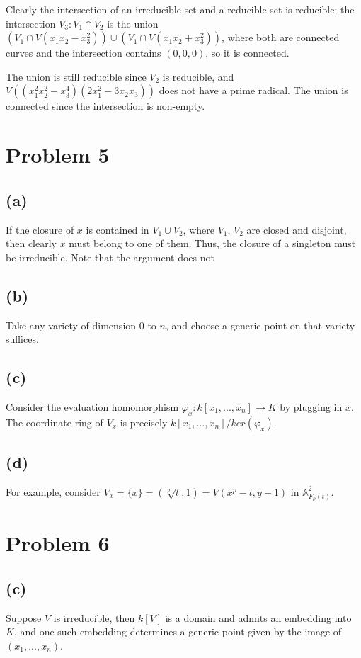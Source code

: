 \documentclass{article}
\theoremstyle{definition}
\theoremstyle{definition}
\theoremstyle{definition}
\theoremstyle{definition}
\theoremstyle{definition}
\theoremstyle{definition}
\theoremstyle{definition}
\begin{document}
Clearly the intersection of an irreducible set and a reducible set is reducible; the intersection $V_3:V_1\cap V_2$ is the union $(V_1\cap V(x_1x_2-x_3^2))\cup (V_1\cap V(x_1x_2+x_3^2))$, where both are connected curves and the intersection contains $(0,0,0)$, so it is connected.

The union is still reducible since $V_2$ is reducible, and $V((x_1^2x_2^2-x_3^4)(2x_1^2-3x_2x_3))$ does not have a prime radical. The union is connected since the intersection is non-empty.

\section*{Problem 5}
\subsection*{(a)}
If the closure of $x$ is contained in $V_1\cup V_2$, where $V_1$, $V_2$ are closed and disjoint, then clearly $x$ must belong to one of them. Thus, the closure of a singleton must be irreducible. Note that the argument does not 

\subsection*{(b)}
Take any variety of dimension $0$ to $n$, and choose a generic point on that variety suffices.

\subsection*{(c)}
Consider the evaluation homomorphism $\varphi_x: k[x_1,...,x_n]\to K$ by plugging in $x$. The coordinate ring of $V_x$ is precisely $k[x_1,...,x_n]/ker(\varphi_x)$. 

\subsection*{(d)}
For example, consider $V_x=\{x\}=(\sqrt[p]{t},1)=V(x^p-t,y-1)$ in $\mathbb{A}^2_{F_p(t)}$. 


\section*{Problem 6}
\subsection*{(c)}
Suppose $V$ is irreducible, then $k[V]$ is a domain and admits an embedding into $K$, and one such embedding determines a generic point given by the image of $(x_1,...,x_n)$. 
\end{document}
